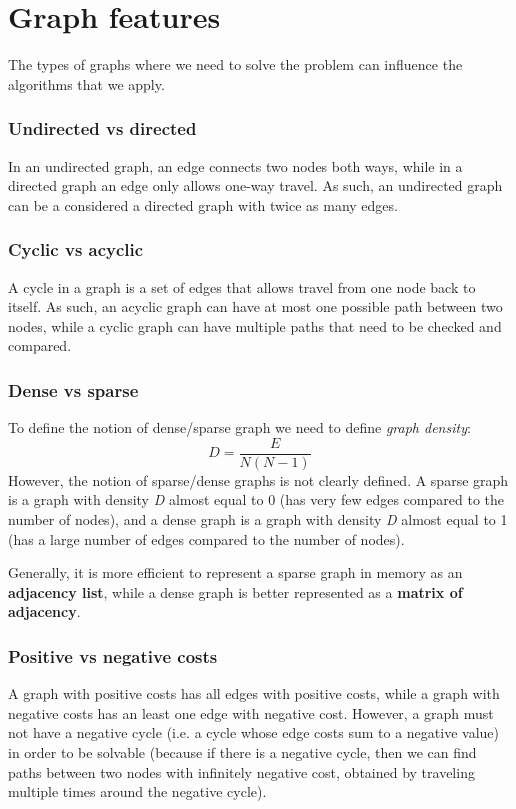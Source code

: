 \documentclass[runningheads]{llncs}
\begin{document}
\section{Graph features}
The types of graphs where we need to solve the problem can influence the algorithms that we apply.
\subsubsection{Undirected vs directed}
In an undirected graph, an edge connects two nodes both ways, while in a directed graph an edge only allows one-way travel. As such, an undirected graph can be a considered a directed graph with twice as many edges.

\subsubsection{Cyclic vs acyclic}
A cycle in a graph is a set of edges that allows travel from one node back to itself. As such, an acyclic graph can have at most one possible path between two nodes, while a cyclic graph can have multiple paths that need to be checked and compared.

\subsubsection{Dense vs sparse}
To define the notion of dense/sparse graph we need to define \textit{graph density}\cite{ref_url_dense}:
\begin{equation}
D = \frac{E}{N(N-1)}
\end{equation}
However, the notion of sparse/dense graphs is not clearly defined. A sparse graph is a graph with density \textit{D} almost equal to 0 (has very few edges compared to the number of nodes), and a dense graph is a graph with density \textit{D} almost equal to 1 (has a large number of edges compared to the number of nodes).

Generally, it is more efficient to represent a sparse graph in memory as an \textbf{adjacency list}, while a dense graph is better represented as a \textbf{matrix of adjacency}.

\subsubsection{Positive vs negative costs}
A graph with positive costs has all edges with positive costs, while a graph with negative costs has an least one edge with negative cost. However, a graph must not have a negative cycle (i.e. a cycle whose edge costs sum to a negative value) in order to be solvable (because if there is a negative cycle, then we can find paths between two nodes with infinitely negative cost, obtained by traveling multiple times around the negative cycle).
\end{document}
